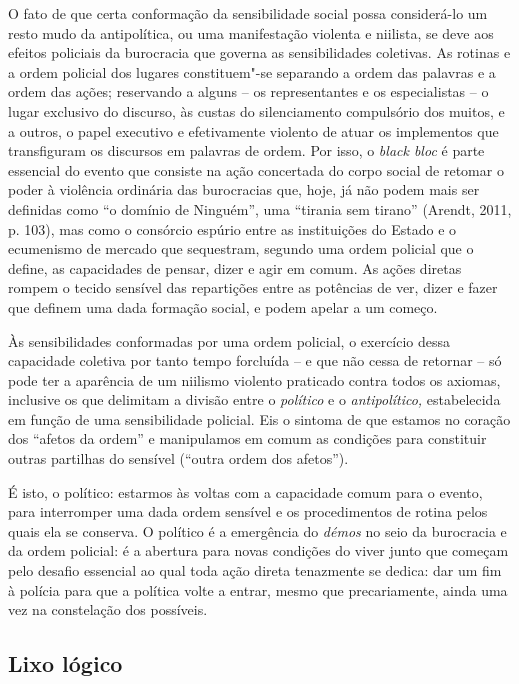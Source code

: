 O fato de que certa conformação da sensibilidade social possa
considerá-lo um resto mudo da antipolítica, ou uma manifestação violenta
e niilista, se deve aos efeitos policiais da burocracia que governa as
sensibilidades coletivas. As rotinas e a ordem policial dos lugares
constituem"-se separando a ordem das palavras e a ordem das ações;
reservando a alguns -- os representantes e os especialistas -- o lugar
exclusivo do discurso, às custas do silenciamento compulsório dos
muitos, e a outros, o papel executivo e efetivamente violento de atuar
os implementos que transfiguram os discursos em palavras de ordem. Por
isso, o \emph{black bloc} é parte essencial do evento que consiste na
ação concertada do corpo social de retomar o poder à violência ordinária
das burocracias que, hoje, já não podem mais ser definidas como ``o
domínio de Ninguém'', uma ``tirania sem tirano'' (Arendt, 2011, p. 103),
mas como o consórcio espúrio entre as instituições do Estado e o
ecumenismo de mercado que sequestram, segundo uma ordem policial que o
define, as capacidades de pensar, dizer e agir em comum. As ações
diretas rompem o tecido sensível das repartições entre as potências de
ver, dizer e fazer que definem uma dada formação social, e podem apelar
a um começo.

Às sensibilidades conformadas por uma ordem policial, o exercício dessa
capacidade coletiva por tanto tempo forcluída -- e que não cessa de
retornar -- só pode ter a aparência de um niilismo violento praticado
contra todos os axiomas, inclusive os que delimitam a divisão entre o
\emph{político }e o\emph{ antipolítico,} estabelecida em função de uma
sensibilidade policial. Eis o sintoma de que estamos no coração dos
``afetos da ordem'' e manipulamos em comum as condições para constituir
outras partilhas do sensível (``outra ordem dos afetos'').

É isto, o político: estarmos às voltas com a capacidade comum para o
evento, para interromper uma dada ordem sensível e os procedimentos de
rotina pelos quais ela se conserva. O político é a emergência do
\emph{démos} no seio da burocracia e da ordem policial: é a abertura
para novas condições do viver junto que começam pelo desafio essencial
ao qual toda ação direta tenazmente se dedica: dar um fim à polícia para
que a política volte a entrar, mesmo que precariamente, ainda uma vez na
constelação dos possíveis.

\subsection{Lixo lógico}

